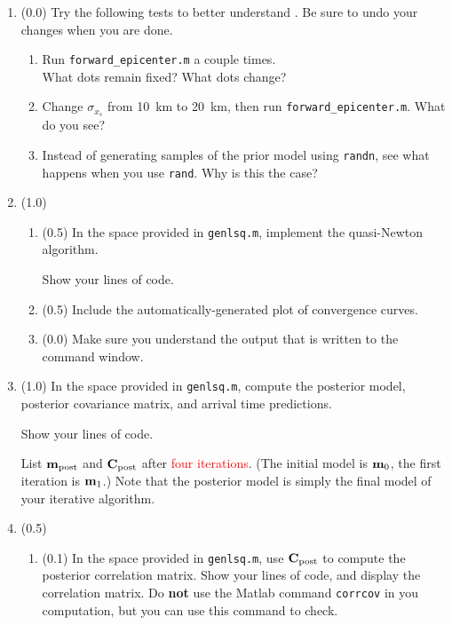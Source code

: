 \documentclass[11pt,titlepage,fleqn]{article}
\begin{document}
\begin{enumerate}

\item (0.0) Try the following tests to better understand . Be sure to undo your changes when you are done.
%
\begin{enumerate}
\item Run \verb+forward_epicenter.m+ a couple times. \\
What dots remain fixed? What dots change?

\item Change $\sigma_{x_s}$ from 10~km to 20~km, then run \verb+forward_epicenter.m+. What do you see?

\item Instead of generating samples of the prior model using \verb+randn+, see what happens when you use \verb+rand+. Why is this the case?
\end{enumerate}

\item (1.0)
%
\begin{enumerate}
\item (0.5) In the space provided in \verb+genlsq.m+, implement the quasi-Newton algorithm.

Show your lines of code.

\item (0.5) Include the automatically-generated plot of convergence curves.

\item (0.0) Make sure you understand the output that is written to the command window.
\end{enumerate}


\item (1.0) In the space provided in \verb+genlsq.m+, compute the posterior model, posterior covariance matrix, and arrival time predictions.

Show your lines of code.

List $\mbox{${\bf m}$}_{\rm post}$ and $\mbox{${\bf C}$}_{\rm post}$ after \textcolor{red}{four iterations}. (The initial model is $\mbox{${\bf m}$}_0$, the first iteration is $\mbox{${\bf m}$}_1$.) Note that the posterior model is simply the final model of your iterative algorithm.


\item (0.5) 
\begin{enumerate}
\item (0.1) In the space provided in \verb+genlsq.m+, use $\mbox{${\bf C}$}_{\rm post}$ to compute the posterior correlation matrix. Show your lines of code, and display the correlation matrix. Do {\bf not} use the Matlab command \verb+corrcov+ in you computation, but you can use this command to check.


\end{enumerate}
\end{enumerate}
\end{document}
